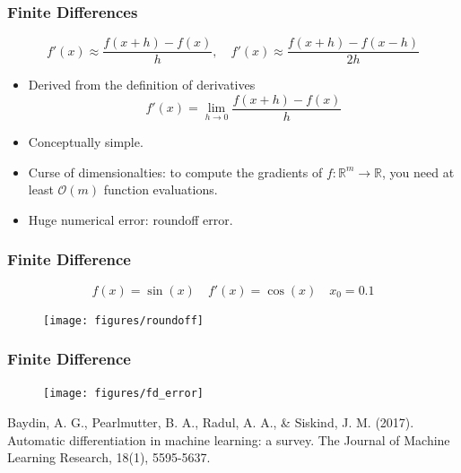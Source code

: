 \documentclass{beamer}
\newcommand{\RR}[0]{\mathbb{R}}
\begin{document}
\begin{frame}
	\frametitle{Finite Differences}


	$$f'(x) \approx \frac{f(x+h) - f(x)}{h},\quad f'(x)\approx \frac{f(x+h) - f(x-h)}{2h}$$
	\begin{itemize}
	\item Derived from the definition of derivatives
	\begin{equation*}
		f'(x) = \lim_{h\rightarrow 0} \frac{f(x+h)-f(x)}{h}
	\end{equation*}
	\item Conceptually simple.
	\item Curse of dimensionalties: to compute the gradients of $f:\RR^m \rightarrow \RR$, you need at least $\mathcal{O}(m)$ function evaluations. 
	\item Huge numerical error: roundoff error. 
	\end{itemize}
		
\end{frame}


\begin{frame}
	\frametitle{Finite Difference}
\begin{equation*}
	f(x) = \sin(x) \quad f'(x) = \cos(x) \quad  x_0 = 0.1
\end{equation*}
	\begin{figure}[hbt]
	\centering
  \texttt{[image: figures/roundoff]}
\end{figure}

\end{frame}

\begin{frame}
	\frametitle{Finite Difference}
	\begin{figure}[hbt]
	\centering
  \texttt{[image: figures/fd\_error]}
\end{figure}
\vspace{-0.5cm}
\scriptsize{Baydin, A. G., Pearlmutter, B. A., Radul, A. A., \& Siskind, J. M. (2017). Automatic differentiation in machine learning: a survey. The Journal of Machine Learning Research, 18(1), 5595-5637.}
\end{frame}
\end{document}
